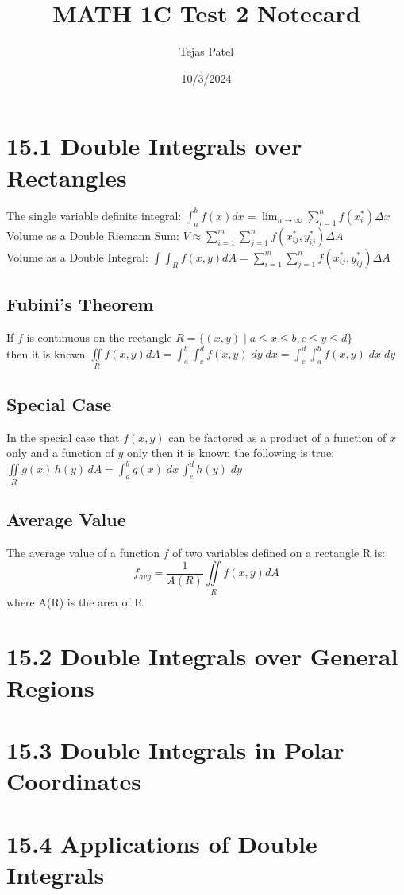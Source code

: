 \documentclass{article}
\title{MATH 1C Test 2 Notecard}
\date{10/3/2024}
\author{Tejas Patel}
\begin{document}
\maketitle
\section*{15.1 Double Integrals over Rectangles}
The single variable definite integral: $\int_{a}^{b} f(x) dx = \lim_{n\to\infty} \sum_{i=1}^{n} f(x^*_i) \Delta x$
\\ Volume as a Double Riemann Sum: $V \approx \sum_{i=1}^{m}\sum_{j=1}^{n} f(x^*_{ij}, y^*_{ij}) \Delta A$
\\ Volume as a Double Integral: $\int\int_{R}f(x,y) dA = \sum_{i=1}^{m}\sum_{j=1}^{n} f(x^*_{ij}, y^*_{ij}) \Delta A$
\subsection*{Fubini's Theorem}
If $f$ is continuous on the rectangle $R=\{(x,y) \; | \; a \leq x \leq b,c\leq y \leq d\}$
\\[0.1in]then it is known $\iint\limits_{R} f(x,y)dA = \int_{a}^{b}\int_{c}^{d}f(x,y)\; dy \; dx = \int_{c}^{d}\int_{a}^{b} f(x,y) \; dx \; dy$
\subsection*{Special Case}
In the special case that $f(x,y)$ can be factored as a product of a function of $x$ only and a function of $y$ only then it is known the following is true:
\\[0.1in] $\iint\limits_{R} g(x)\,h(y)\,dA =\int_{a}^{b}g(x)\; dx\, \int_{c}^{d} h(y)\; dy$
\subsection*{Average Value}
The average value of a function $f$ of two variables defined on a rectangle R is:
\\$$ f_{avg}=\frac{1}{A(R)} \iint\limits_{R} f(x,y)dA$$ where A(R) is the area of R.
\section*{15.2 Double Integrals over General Regions}
\section*{15.3 Double Integrals in Polar Coordinates}
\section*{15.4 Applications of Double Integrals}
\end{document}
